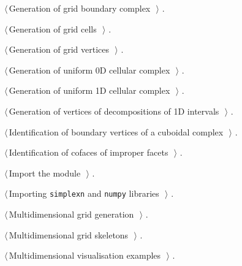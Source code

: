 \documentclass[11pt,oneside]{article}	%
\begin{document}
{\begin{list}{}{\setlength{\itemsep}{-\parsep}\setlength{\itemindent}{-\leftmargin}}
\item $\langle\,$Generation of grid boundary complex\nobreak\ {\footnotesize {}}$\,\rangle$ {\footnotesize {\NWtxtRefIn} .}
\item $\langle\,$Generation of grid cells\nobreak\ {\footnotesize {}}$\,\rangle$ {\footnotesize {\NWtxtRefIn} .}
\item $\langle\,$Generation of grid vertices\nobreak\ {\footnotesize {}}$\,\rangle$ {\footnotesize {\NWtxtRefIn} .}
\item $\langle\,$Generation of uniform 0D cellular complex\nobreak\ {\footnotesize {}}$\,\rangle$ {\footnotesize {\NWtxtRefIn} .}
\item $\langle\,$Generation of uniform 1D cellular complex\nobreak\ {\footnotesize {}}$\,\rangle$ {\footnotesize {\NWtxtRefIn} .}
\item $\langle\,$Generation of vertices of decompositions of 1D intervals\nobreak\ {\footnotesize {}}$\,\rangle$ {\footnotesize {\NWtxtRefIn} .
}
\item $\langle\,$Identification of boundary vertices of a cuboidal complex\nobreak\ {\footnotesize {}}$\,\rangle$ {\footnotesize {\NWtxtNoRef}.}
\item $\langle\,$Identification of cofaces of improper facets\nobreak\ {\footnotesize {}}$\,\rangle$ {\footnotesize {\NWtxtNoRef}.}
\item $\langle\,$Import the module\nobreak\ {\footnotesize {}}$\,\rangle$ {\footnotesize {\NWtxtRefIn} .
}
\item $\langle\,$Importing \texttt{simplexn} and \texttt{numpy} libraries\nobreak\ {\footnotesize {}}$\,\rangle$ {\footnotesize {\NWtxtRefIn} .}
\item $\langle\,$Multidimensional grid generation\nobreak\ {\footnotesize {}}$\,\rangle$ {\footnotesize {\NWtxtRefIn} .}
\item $\langle\,$Multidimensional grid skeletons\nobreak\ {\footnotesize {}}$\,\rangle$ {\footnotesize {\NWtxtRefIn} .}
\item $\langle\,$Multidimensional visualisation examples\nobreak\ {\footnotesize {}}$\,\rangle$ {\footnotesize {\NWtxtRefIn} .}

\end{list}}
\end{document}
